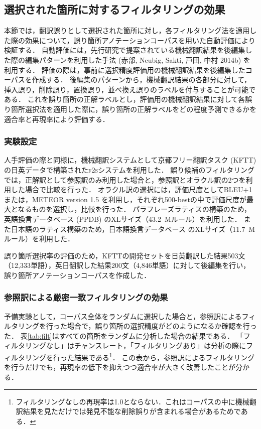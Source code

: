 \documentclass[japanese]{jnlp_1.4}
\begin{document}
\subsection{選択された箇所に対するフィルタリングの効果}
\label{sec:auto-analysis-result}

本節では，翻訳誤りとして選択された箇所に対し，各フィルタリング法を適用した際の効果について，誤り箇所アノテーションコーパスを用いた自動評価により検証する．
    自動評価には，先行研究で提案されている機械翻訳結果を後編集した際の編集パターンを利用した手法 (赤部, Neubig, Sakti, 戸田, 中村 2014b) を利用する．\nocite{akabe14signl219}
評価の際は，事前に選択精度評価用の機械翻訳結果を後編集したコーパスを作成する．
後編集のパターンから，機械翻訳結果の各部分に対して，挿入誤り，削除誤り，置換誤り，並べ換え誤りのラベルを付与することが可能である．
これを誤り箇所の正解ラベルとし，評価用の機械翻訳結果に対して各誤り箇所選択法を適用した際に，誤り箇所の正解ラベルをどの程度予測できるかを適合率と再現率により評価する．


\subsubsection{実験設定}

人手評価の際と同様に，機械翻訳システムとして京都フリー翻訳タスク (KFTT) \cite{neubig11kftt}の日英データで構築された\textsc{f2s}システムを利用した．
誤り候補のフィルタリングでは，正解訳として参照訳のみ利用した場合と，参照訳とオラクル訳の2つを利用した場合で比較を行った．
オラクル訳の選択には，評価尺度としてBLEU+1または，METEOR version 1.5 \cite{denkowski:lavie:meteor-wmt:2014}を利用し，それぞれ500-bestの中で評価尺度が最大となるものを選択し，比較を行った．
パラフレーズラティスの構築のため，英語換言データベース (PPDB) \cite{ganitkevitch2013ppdb}のXLサイズ（43.2~Mルール）を利用した．
また日本語のラティス構築のため，日本語換言データベース \cite{mizukami14cocosda}のXLサイズ（11.7~Mルール）を利用した．

誤り箇所選択率の評価のため，KFTTの開発セットを日英翻訳した結果503文（12,333単語），英日翻訳した結果200文（4,846単語）に対して後編集を行い，誤り箇所アノテーションコーパスを作成した．


\subsubsection{参照訳による厳密一致フィルタリングの効果}

予備実験として，コーパス全体をランダムに選択した場合と，参照訳によるフィルタリングを行った場合で，誤り箇所の選択精度がどのようになるか確認を行った．
表\ref{tab:filt}はすべての箇所をランダムに分析した場合の結果である．
「フィルタリングなし」はチャンスレート，「フィルタリングあり」は分析の際にフィルタリングを行った結果である\footnote{フィルタリングなしの再現率は1.0とならない．これはコーパスの中に機械翻訳結果を見ただけでは発見不能な削除誤りが含まれる場合があるためである．}．
この表から，参照訳によるフィルタリングを行うだけでも，再現率の低下を抑えつつ適合率が大きく改善したことが分かる．
\end{document}
